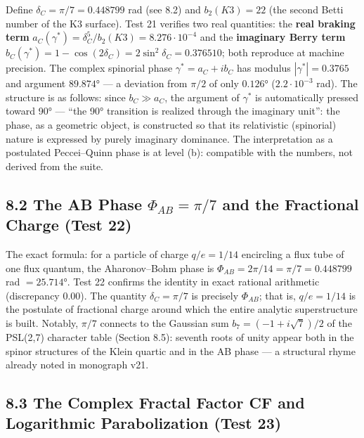 \documentclass[
]{article}
\begin{document}
Define \(\delta_C = \pi/7 = 0.448799\) rad (see 8.2) and
\(b_2(K3) = 22\) (the second Betti number of the K3 surface). Test 21
verifies two real quantities: the \textbf{real braking term}
\(a_C(\gamma^{\ast}) = \delta_C^5/b_2(K3) = 8.276\cdot10^{-4}\) and the
\textbf{imaginary Berry term}
\(b_C(\gamma^{\ast}) = 1-\cos(2\delta_C) = 2\sin^2\delta_C = 0.376510\);
both reproduce at machine precision. The complex spinorial phase
\(\gamma^{\ast} = a_C + i b_C\) has modulus \(|\gamma^{\ast}| = 0.3765\)
and argument \(89.874°\) --- a deviation from \(\pi/2\) of only
\(0.126°\) (\(2.2\cdot10^{-3}\) rad). The structure is as follows: since
\(b_C \gg a_C\), the argument of \(\gamma^{\ast}\) is automatically
pressed toward 90° --- ``the 90° transition is realized through the
imaginary unit'': the phase, as a geometric object, is constructed so
that its relativistic (spinorial) nature is expressed by purely
imaginary dominance. The interpretation as a postulated Peccei--Quinn
phase is at level (b): compatible with the numbers, not derived from the
suite.

\subsection{\texorpdfstring{8.2 The AB Phase \(\Phi_{AB} = \pi/7\) and
the Fractional Charge (Test
22)}{8.2 The AB Phase \textbackslash Phi\_\{AB\} = \textbackslash pi/7 and the Fractional Charge (Test 22)}}\label{the-ab-phase-phi_ab-pi7-and-the-fractional-charge-test-22}

The exact formula: for a particle of charge \(q/e = 1/14\) encircling a
flux tube of one flux quantum, the Aharonov--Bohm phase is
\(\Phi_{AB} = 2\pi/14 = \pi/7 = 0.448799\) rad \(= 25.714°\). Test 22
confirms the identity in exact rational arithmetic (discrepancy
\(0.00\)). The quantity \(\delta_C=\pi/7\) is precisely \(\Phi_{AB}\);
that is, \(q/e=1/14\) is the postulate of fractional charge around which
the entire analytic superstructure is built. Notably, \(\pi/7\) connects
to the Gaussian sum \(b_7=(-1+i\sqrt7)/2\) of the PSL(2,7) character
table (Section 8.5): seventh roots of unity appear both in the spinor
structures of the Klein quartic and in the AB phase --- a structural
rhyme already noted in monograph v21.

\subsection{8.3 The Complex Fractal Factor CF and Logarithmic
Parabolization (Test
23)}\label{the-complex-fractal-factor-cf-and-logarithmic-parabolization-test-23}
\end{document}

